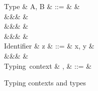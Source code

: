 \begin{figure}[H]
\begin{syntaxfig}
\mbox{Type}
&
A, B
&
::=
&
\tyNat
&
\\
&&&
&
\\
&&&
&
\\
&&&
&
\\[2mm]
\mbox{Identifier}
&
z
&
::=
&
x, y
&
\\
&&&
\primOp
&
\\[2mm]
\mbox{Typing context}
&
\Gamma, \Delta
&
::=
&
\end{syntaxfig}
\caption{Typing contexts and types}
\end{figure}
